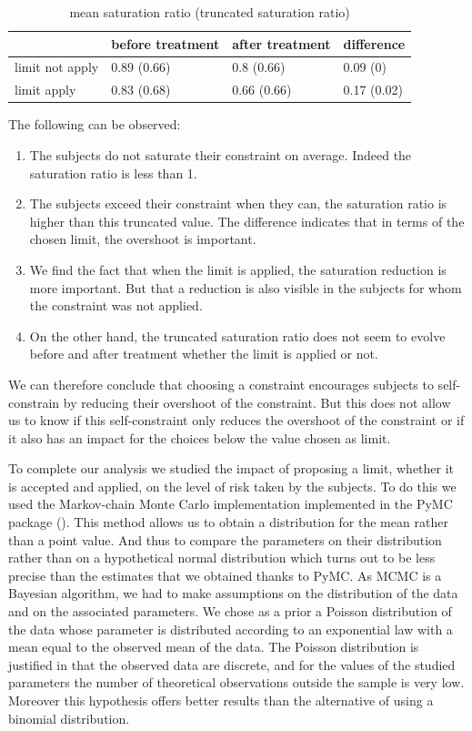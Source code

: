 \documentclass[
]{book}
\providecommand{\tightlist}{%
  \setlength{\itemsep}{0pt}\setlength{\parskip}{0pt}}
\begin{document}
\begin{table}

\caption{\label{tab:sat-ratio2}mean saturation ratio (truncated saturation ratio)}
\centering
\begin{tabular}[t]{l|l|l|l}
\hline
 & before treatment & after treatment & difference\\
\hline
limit not apply & 0.89 (0.66) & 0.8 (0.66) & 0.09 (0)\\
\hline
limit apply & 0.83 (0.68) & 0.66 (0.66) & 0.17 (0.02)\\
\hline
\end{tabular}
\end{table}

The following can be observed:

\begin{enumerate}
\def\labelenumi{\arabic{enumi}.}
\tightlist
\item
  The subjects do not saturate their constraint on average.
  Indeed the saturation ratio is less than 1.
\item
  The subjects exceed their constraint when they can, the saturation ratio is
  higher than this truncated value.
  The difference indicates that in terms of the chosen limit, the overshoot is
  important.
\item
  We find the fact that when the limit is applied, the saturation reduction is
  more important.
  But that a reduction is also visible in the subjects for whom the constraint was
  not applied.
\item
  On the other hand, the truncated saturation ratio does not seem to evolve
  before and after treatment whether the limit is applied or not.
\end{enumerate}

We can therefore conclude that choosing a constraint encourages subjects to
self-constrain by reducing their overshoot of the constraint.
But this does not allow us to know if this self-constraint only reduces the
overshoot of the constraint or if it also has an impact for the choices below
the value chosen as limit.

To complete our analysis we studied the impact of proposing a limit, whether it
is accepted and applied, on the level of risk taken by the subjects.
To do this we used the Markov-chain Monte Carlo implementation implemented in
the PyMC package (\citet{salvatier2016probabilistic}).
This method allows us to obtain a distribution for the mean rather than a point
value.
And thus to compare the parameters on their distribution rather than on a
hypothetical normal distribution which turns out to be less precise than the
estimates that we obtained thanks to PyMC.
As MCMC is a Bayesian algorithm, we had to make assumptions on the distribution
of the data and on the associated parameters.
We chose as a prior a Poisson distribution of the data whose parameter is
distributed according to an exponential law with a mean equal to the observed
mean of the data.
The Poisson distribution is justified in that the observed data are discrete,
and for the values of the studied parameters the number of theoretical
observations outside the sample is very low.
Moreover this hypothesis offers better results than the alternative of using a
binomial distribution.
\end{document}
